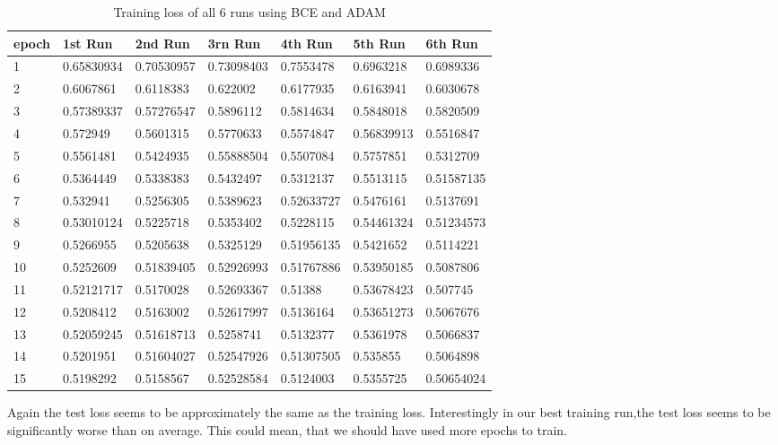\begin{table}[!ht]
    \centering
    \begin{tabular}{|l||l||l||l||l||l||l|}
    \hline
    epoch & 1st Run & 2nd Run & 3rn Run & 4th Run & 5th Run & 6th Run \\ \hline
        1 & 0.65830934 & 0.70530957 & 0.73098403 & 0.7553478 & 0.6963218 & 0.6989336 \\ \hline
        2 & 0.6067861 & 0.6118383 & 0.622002 & 0.6177935 & 0.6163941 & 0.6030678 \\ \hline
        3 & 0.57389337 & 0.57276547 & 0.5896112 & 0.5814634 & 0.5848018 & 0.5820509 \\ \hline
        4 & 0.572949 & 0.5601315 & 0.5770633 & 0.5574847 & 0.56839913 & 0.5516847 \\ \hline
        5 & 0.5561481 & 0.5424935 & 0.55888504 & 0.5507084 & 0.5757851 & 0.5312709 \\ \hline
        6 & 0.5364449 & 0.5338383 & 0.5432497 & 0.5312137 & 0.5513115 & 0.51587135 \\ \hline
        7 & 0.532941 & 0.5256305 & 0.5389623 & 0.52633727 & 0.5476161 & 0.5137691 \\ \hline
        8 & 0.53010124 & 0.5225718 & 0.5353402 & 0.5228115 & 0.54461324 & 0.51234573 \\ \hline
        9 & 0.5266955 & 0.5205638 & 0.5325129 & 0.51956135 & 0.5421652 & 0.5114221 \\ \hline
        10 & 0.5252609 & 0.51839405 & 0.52926993 & 0.51767886 & 0.53950185 & 0.5087806 \\ \hline
        11 & 0.52121717 & 0.5170028 & 0.52693367 & 0.51388 & 0.53678423 & 0.507745 \\ \hline
        12 & 0.5208412 & 0.5163002 & 0.52617997 & 0.5136164 & 0.53651273 & 0.5067676 \\ \hline
        13 & 0.52059245 & 0.51618713 & 0.5258741 & 0.5132377 & 0.5361978 & 0.5066837 \\ \hline
        14 & 0.5201951 & 0.51604027 & 0.52547926 & 0.51307505 & 0.535855 & 0.5064898 \\ \hline
        15 & 0.5198292 & 0.5158567 & 0.52528584 & 0.5124003 & 0.5355725 & 0.50654024 \\ \hline
    \end{tabular}
    \caption{\label{tab:bce_adam_train}Training loss of all 6 runs using BCE and ADAM}
\end{table}

Again the test loss seems to be approximately the same as the training loss. Interestingly in our best
training run,the test loss seems to be significantly worse than on average. This could mean, that we should
have used more epochs to train.

